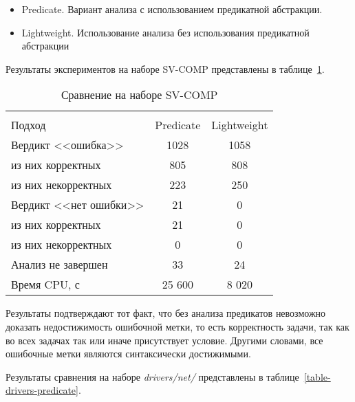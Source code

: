 \begin{itemize}
\item Predicate. Вариант анализа с использованием предикатной абстракции.
\item Lightweight. Использование анализа без использования предикатной абстракции
\end{itemize}

Результаты экспериментов на наборе SV-COMP представлены в таблице~\ref{table-svcomp-without-predicate}.

  \begin{table}[h]\footnotesize \centering
    \caption{Сравнение на наборе SV-COMP}
  	\label{table-svcomp-without-predicate}
    \begin{tabular}{ | l | c | c |}
      \hline
      		& 		\multicolumn{2}{c|}{\combatmode}  \\
      Подход         				&  Predicate	& Lightweight 		\\ \hline
      Вердикт <<ошибка>> 				& 1028   		& 1058   	\\ 
  \hspace{0.5cm} из них корректных 	& 805 			& 808 	 	\\ 
  \hspace{0.5cm} из них некорректных & 223 			& 250 	   	\\ \hline
      Вердикт <<нет ошибки>>  		& 21    		& 0     	\\ 
  \hspace{0.5cm} из них корректных 	& 21 			& 0    		\\
  \hspace{0.5cm} из них некорректных & 0 			& 0    	  	\\ \hline
      Анализ не завершен       		& 33    		& 24      	\\ \hline
      Время CPU, с   				& 25 600 		& 8 020  	\\ 
      \hline
    \end{tabular}
  \end{table}

Результаты подтверждают тот факт, что без анализа предикатов невозможно доказать недостижимость ошибочной метки, то есть корректность задачи, так как во всех задачах так или иначе присутствует условие.
Другими словами, все ошибочные метки являются синтаксически достижимыми.

Результаты сравнения на наборе \textit{drivers/net/} представлены в таблице~\ref{table-drivers-predicate}.

